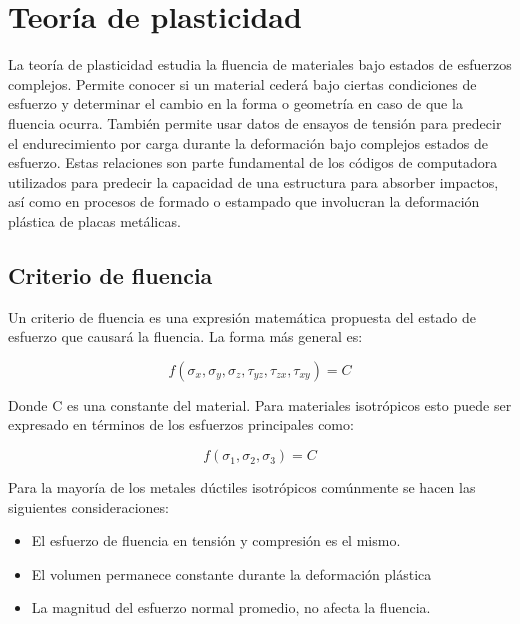 \section{Teoría de plasticidad}

La teoría de plasticidad estudia la fluencia de materiales bajo estados de esfuerzos complejos. Permite 
conocer si un material cederá bajo ciertas condiciones de esfuerzo y determinar el cambio en la forma o 
geometría en caso de que la fluencia ocurra. También permite usar datos de ensayos de tensión para predecir 
el endurecimiento por carga durante la deformación bajo complejos estados de esfuerzo. Estas relaciones 
son parte fundamental de los códigos de computadora utilizados para predecir la capacidad de una estructura 
para absorber impactos, así como en procesos de formado o estampado que involucran la deformación plástica de 
placas metálicas. ~\cite{hosford2005}

\subsection{Criterio de fluencia}

Un criterio de fluencia es una expresión matemática propuesta del estado de esfuerzo que causará 
la fluencia. La forma más general es: ~\cite{hosford2005}

\begin{equation}
f(\sigma_x,\sigma_y, \sigma_z, \tau_{yz}, \tau_{zx}, \tau_{xy} ) = C 
\end{equation}

Donde C es una constante del material. Para materiales isotrópicos esto puede ser expresado en 
términos de los esfuerzos principales como: ~\cite{hosford2005}

\begin{equation}
f(\sigma_1,\sigma_2,\sigma_3 )=C
\end{equation}

Para la mayoría de los metales dúctiles isotrópicos comúnmente se hacen las siguientes consideraciones: ~\cite{hosford2007}


\begin{itemize}
\item El esfuerzo de fluencia en tensión y compresión es el mismo.
\item El volumen permanece constante durante la deformación plástica
\item La magnitud del esfuerzo normal promedio, no afecta la fluencia.
\end{itemize}

